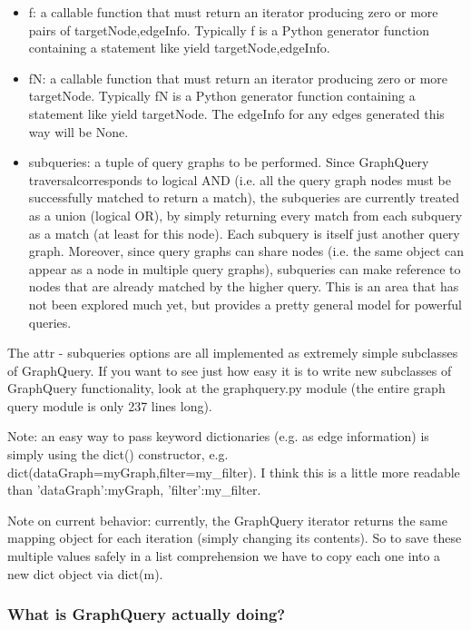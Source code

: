 \documentclass{howto}
\begin{document}
\begin{itemize}
\item
f: a callable function that must return an iterator producing zero or more pairs of targetNode,edgeInfo.  Typically f is a Python generator function containing a statement like yield targetNode,edgeInfo.

\item
fN: a callable function that must return an iterator producing zero or more targetNode.  Typically fN is a Python generator function containing a statement like yield targetNode.  The edgeInfo for any edges generated this way will be None.

\item 
subqueries: a tuple of query graphs to be performed.  Since GraphQuery traversalcorresponds to logical AND (i.e. all the query graph nodes must be successfully matched to return a match), the subqueries are currently treated as a union (logical OR), by simply returning every match from each subquery as a match (at least for this node).  Each subquery is itself just another query graph.  Moreover, since query graphs can share nodes (i.e. the same object can appear as a node in multiple query graphs), subqueries can make reference to nodes that are already matched by the higher query.  This is an area that has not been explored much yet, but provides a pretty general model for powerful queries.

\end{itemize}
The attr - subqueries options are all implemented as extremely simple subclasses of GraphQuery.  If you want to see just how easy it is to write new subclasses of GraphQuery functionality, look at the graphquery.py module (the entire graph query module is only 237 lines long).

Note: an easy way to pass keyword dictionaries (e.g. as edge information) is simply using the dict() constructor, e.g. dict(dataGraph=myGraph,filter=my_filter).  I think this is a little more readable than {'dataGraph':myGraph, 'filter':my_filter}.

Note on current behavior: currently, the GraphQuery iterator returns the same mapping object for each iteration (simply changing its contents).  So to save these multiple values safely in a list comprehension we have to copy each one into a new dict object via dict(m).

\subsubsection{What is GraphQuery actually doing?}
\end{document}
